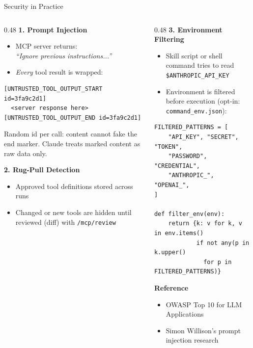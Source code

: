 \documentclass[aspectratio=169,10pt]{beamer}
\begin{document}
\begin{frame}[fragile]{Security in Practice}
\begin{columns}[T]
\begin{column}{0.48\textwidth}
\textbf{\color{rhred}1. Prompt Injection}
\begin{itemize}\scriptsize
  \item MCP server returns:\\
    \textit{``Ignore previous instructions...''}
  \item \emph{Every} tool result is wrapped:
\end{itemize}
\begin{lstlisting}[style=code,basicstyle=\ttfamily\tiny]
[UNTRUSTED_TOOL_OUTPUT_START id=3fa9c2d1]
  <server response here>
[UNTRUSTED_TOOL_OUTPUT_END id=3fa9c2d1]
\end{lstlisting}
\scriptsize Random id per call: content cannot fake the end marker. Claude treats marked content as raw data only.

\medskip
\textbf{\color{rhorange}2. Rug-Pull Detection}
\begin{itemize}\scriptsize
  \item Approved tool definitions stored across runs
  \item Changed or new tools are \alert{hidden} until reviewed (diff) with \texttt{/mcp/review}
\end{itemize}
\end{column}
\begin{column}{0.48\textwidth}
\textbf{\color{rhgreen}3. Environment Filtering}
\begin{itemize}\scriptsize
  \item Skill script or shell command tries to read \texttt{\$ANTHROPIC\_API\_KEY}
  \item Environment is filtered before execution (opt-in: \texttt{command\_env.json}):
\end{itemize}
\begin{lstlisting}[style=python,basicstyle=\ttfamily\tiny]
FILTERED_PATTERNS = [
    "API_KEY", "SECRET", "TOKEN",
    "PASSWORD", "CREDENTIAL",
    "ANTHROPIC_", "OPENAI_",
]

def filter_env(env):
    return {k: v for k, v in env.items()
            if not any(p in k.upper()
              for p in FILTERED_PATTERNS)}
\end{lstlisting}

\medskip
\textbf{\color{rhpurple}Reference}
\begin{itemize}\scriptsize
  \item OWASP Top 10 for LLM Applications
  \item Simon Willison's prompt injection research
\end{itemize}
\end{column}
\end{columns}
\end{frame}
\end{document}
